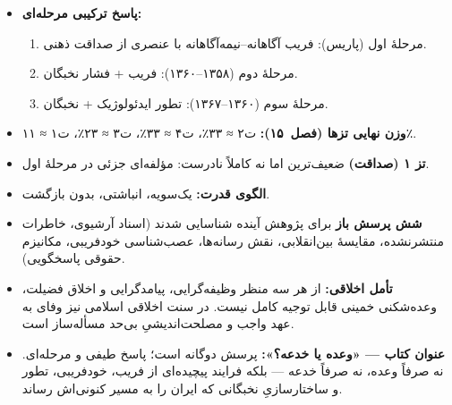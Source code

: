 
\begin{principleBox}
\begin{itemize}
\item \textbf{پاسخ ترکیبی مرحله‌ای:}
  \begin{enumerate}[nosep]
    \item مرحلهٔ اول (پاریس):
      \textcolor{cAccent}{فریب آگاهانه–نیمه‌آگاهانه}
      با عنصری از صداقت ذهنی.
    \item مرحلهٔ دوم (۱۳۵۸–۱۳۶۰):
      \textcolor{cAccent}{فریب} + \textcolor{cConsolid}{فشار نخبگان}.
    \item مرحلهٔ سوم (۱۳۶۰–۱۳۶۷):
      \textcolor{cGold}{تطور ایدئولوژیک} + \textcolor{cConsolid}{نخبگان}.
  \end{enumerate}

\item \textbf{وزن نهایی تزها (فصل~۱۵):}
  \textcolor{cAccent}{ت‌۲ ≈ ۳۳٪}،
  \textcolor{cConsolid}{ت‌۴ ≈ ۳۳٪}،
  \textcolor{cGold}{ت‌۳ ≈ ۲۳٪}،
  \textcolor{cGreen}{ت‌۱ ≈ ۱۱٪}.

\item \textbf{تز ۱ (صداقت)} ضعیف‌ترین اما نه کاملاً نادرست:
  مؤلفه‌ای جزئی در مرحلهٔ اول.

\item \textbf{الگوی قدرت:} یک‌سویه، انباشتی، بدون بازگشت.

\item \textbf{شش پرسش باز} برای پژوهش آینده شناسایی شدند
  (اسناد آرشیوی، خاطرات منتشرنشده، مقایسهٔ بین‌انقلابی،
  نقش رسانه‌ها، عصب‌شناسی خودفریبی، مکانیزم حقوقی پاسخگویی).

\item \textbf{تأمل اخلاقی:}
  از هر سه منظر وظیفه‌گرایی، پیامدگرایی و اخلاق فضیلت،
  وعده‌شکنی خمینی قابل توجیه کامل نیست.
  در سنت اخلاقی اسلامی نیز
  وفای به عهد واجب و مصلحت‌اندیشیِ بی‌حد مسأله‌ساز است.

\item \textbf{عنوان کتاب — «وعده یا خدعه؟»:}
  پرسش دوگانه است؛ پاسخ طیفی و مرحله‌ای.
  نه صرفاً وعده، نه صرفاً خدعه —
  بلکه فرایند پیچیده‌ای از فریب، خودفریبی،
  تطور و ساختارسازیِ نخبگانی
  که ایران را به مسیر کنونی‌اش رساند.
\end{itemize}
\end{principleBox}


%
%
%
%
